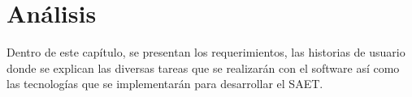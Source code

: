 \chapter{Análisis}
Dentro de este capítulo, se presentan los requerimientos, las historias de usuario donde se explican las diversas tareas que se realizarán con el software así como las tecnologías que se implementarán para desarrollar el SAET.


\clearpage

\clearpage

